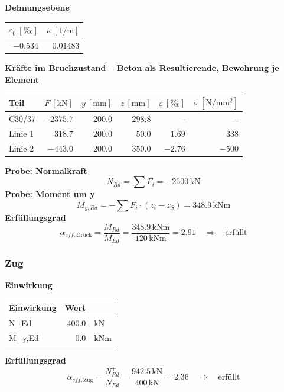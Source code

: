 \documentclass[11pt,a4paper]{article}
\begin{document}
\noindent\textbf{Dehnungsebene}
\begin{longtable}{rr}
\hline
$\varepsilon_0\ [\text{‰}]$ & $\kappa\ [\mathrm{1/m}]$ \\
\hline
\endhead
$-0.534$ & $0.01483$ \\
\hline
\end{longtable}
\noindent\textbf{Kräfte im Bruchzustand -- Beton als Resultierende, Bewehrung je Element}
\begin{longtable}{lrrrrr}
\hline
Teil & $F\ [\mathrm{kN}]$ & $y\ [\mathrm{mm}]$ & $z\ [\mathrm{mm}]$ & $\varepsilon\ [\text{‰}]$ & $\sigma\ [\mathrm{N/mm^2}]$ \\
\hline
\endhead
C30/37 & $-2375.7$ & $200.0$ & $298.8$ & – & – \\
Linie 1 & $318.7$ & $200.0$ & $50.0$ & $1.69$ & $338$ \\
Linie 2 & $-443.0$ & $200.0$ & $350.0$ & $-2.76$ & $-500$ \\
\hline
\end{longtable}
\noindent\textbf{Probe: Normalkraft}
\begin{equation*}
N_{Rd} = \sum F_i = -2500\,\mathrm{kN}
\end{equation*}
\noindent\textbf{Probe: Moment um y}
\begin{equation*}
M_{y,Rd} = -\sum F_i \cdot (z_i - z_S) = 348.9\,\mathrm{kNm}
\end{equation*}
\noindent\textbf{Erfüllungsgrad}
\begin{equation*}
\alpha_{eff,\text{Druck}} = \frac{M_{Rd}}{M_{Ed}} = \frac{348.9\,\mathrm{kNm}}{120\,\mathrm{kNm}} = 2.91 \quad \Rightarrow \quad \text{erfüllt}
\end{equation*}
\subsubsection{Zug}
\noindent\textbf{Einwirkung}
\begin{longtable}{lrl}
\hline
Einwirkung & Wert &  \\
\hline
\endhead
N\_Ed & $400.0$ & kN \\
M\_y,Ed & $0.0$ & kNm \\
\hline
\end{longtable}
\noindent\textbf{Erfüllungsgrad}
\begin{equation*}
\alpha_{eff,\text{Zug}} = \frac{N_{Rd}^{+}}{N_{Ed}} = \frac{942.5\,\mathrm{kN}}{400\,\mathrm{kN}} = 2.36 \quad \Rightarrow \quad \text{erfüllt}
\end{equation*}
\end{document}
